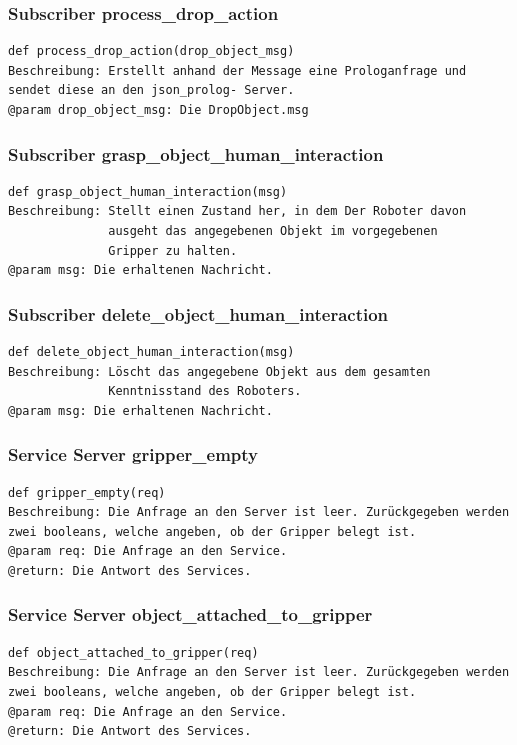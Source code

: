 \documentclass{suturo}
\begin{document}
\subsubsection{Subscriber process\_drop\_action}
\begin{verbatim}
def process_drop_action(drop_object_msg)
Beschreibung: Erstellt anhand der Message eine Prologanfrage und
sendet diese an den json_prolog- Server. 
@param drop_object_msg: Die DropObject.msg
\end{verbatim}

\subsubsection{Subscriber grasp\_object\_human\_interaction}
\begin{verbatim}
def grasp_object_human_interaction(msg)
Beschreibung: Stellt einen Zustand her, in dem Der Roboter davon
              ausgeht das angegebenen Objekt im vorgegebenen
              Gripper zu halten. 
@param msg: Die erhaltenen Nachricht.
\end{verbatim}

\subsubsection{Subscriber delete\_object\_human\_interaction}
\begin{verbatim}
def delete_object_human_interaction(msg)
Beschreibung: Löscht das angegebene Objekt aus dem gesamten 
              Kenntnisstand des Roboters.
@param msg: Die erhaltenen Nachricht.
\end{verbatim}

\subsubsection{Service Server gripper\_empty}
\begin{verbatim}
def gripper_empty(req)
Beschreibung: Die Anfrage an den Server ist leer. Zurückgegeben werden
zwei booleans, welche angeben, ob der Gripper belegt ist.
@param req: Die Anfrage an den Service.
@return: Die Antwort des Services.
\end{verbatim}

\subsubsection{Service Server object\_attached\_to\_gripper}
\begin{verbatim}
def object_attached_to_gripper(req)
Beschreibung: Die Anfrage an den Server ist leer. Zurückgegeben werden
zwei booleans, welche angeben, ob der Gripper belegt ist.
@param req: Die Anfrage an den Service.
@return: Die Antwort des Services.
\end{verbatim}
\end{document}
